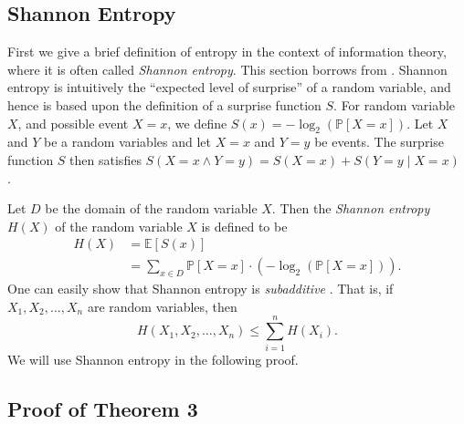 \documentclass[12pt, a4paper]{article}
\begin{document}
\subsection{Shannon Entropy}\label{ssec:shannonEntropy}
First we give a brief definition of entropy in the context of information theory, where it is often called \textit{Shannon entropy}. This section borrows from \cite{DG14}. Shannon entropy is intuitively the ``expected level of surprise'' of a random variable, and hence is based upon the definition of a surprise function $S$. For random variable $X$, and possible event $X=x$, we define $S(x)=-\log_2(\mathbb{P}[X=x])$. Let $X$ and $Y$ be a random variables and let $X=x$ and $Y=y$ be events. The surprise function $S$ then satisfies $S(X=x\land Y=y) = S(X=x) + S(Y=y\mid X=x)$ \cite{DG14}.

Let $D$ be the domain of the random variable $X$. Then the \textit{Shannon entropy} $H(X)$ of the random variable $X$ is defined to be
\begin{align*}
	H(X)
	& = \mathbb{E}[S(x)]\\
	& = \sum_{x\in D}\mathbb{P}[X=x]\cdot (-\log_2(\mathbb{P}[X=x])).
\end{align*}
One can easily show that Shannon entropy is \textit{subadditive} \cite{DG14}. That is, if $X_1, X_2, \ldots, X_n$ are random variables, then
	\begin{equation}\label{subadditivityDefinition}
			H(X_1, X_2, \ldots, X_n)\le \sum_{i=1}^{n}H(X_i).
	\end{equation}
We will use Shannon entropy in the following proof.

\subsection{Proof of Theorem 3}
\end{document}
